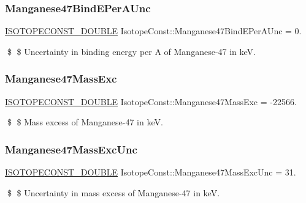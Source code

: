 \subsubsection{\texorpdfstring{Manganese47\+Bind\+E\+Per\+A\+Unc}{Manganese47BindEPerAUnc}}
{\footnotesize\ttfamily \mbox{\hyperlink{group___isotope_const-_macros_ga8f45a7272ce02c0b4c65c44636ed719a}{I\+S\+O\+T\+O\+P\+E\+C\+O\+N\+S\+T\+\_\+\+D\+O\+U\+B\+LE}} Isotope\+Const\+::\+Manganese47\+Bind\+E\+Per\+A\+Unc = 0.}

\$ \$ Uncertainty in binding energy per A of Manganese-\/47 in keV. \mbox{\label{group___isotope_const-_manganese-_mn47_gac756abd03d41fbce77860a550819a2ba}} 
\subsubsection{\texorpdfstring{Manganese47\+Mass\+Exc}{Manganese47MassExc}}
{\footnotesize\ttfamily \mbox{\hyperlink{group___isotope_const-_macros_ga8f45a7272ce02c0b4c65c44636ed719a}{I\+S\+O\+T\+O\+P\+E\+C\+O\+N\+S\+T\+\_\+\+D\+O\+U\+B\+LE}} Isotope\+Const\+::\+Manganese47\+Mass\+Exc = -\/22566.}

\$ \$ Mass excess of Manganese-\/47 in keV. \mbox{\label{group___isotope_const-_manganese-_mn47_gaf9781b40bda1f1010dbdb3a9c39e22a7}} 
\subsubsection{\texorpdfstring{Manganese47\+Mass\+Exc\+Unc}{Manganese47MassExcUnc}}
{\footnotesize\ttfamily \mbox{\hyperlink{group___isotope_const-_macros_ga8f45a7272ce02c0b4c65c44636ed719a}{I\+S\+O\+T\+O\+P\+E\+C\+O\+N\+S\+T\+\_\+\+D\+O\+U\+B\+LE}} Isotope\+Const\+::\+Manganese47\+Mass\+Exc\+Unc = 31.}

\$ \$ Uncertainty in mass excess of Manganese-\/47 in keV. \mbox{\label{group___isotope_const-_manganese-_mn47_ga4d869ec4692dcddde79ece8f03700d27}} 
